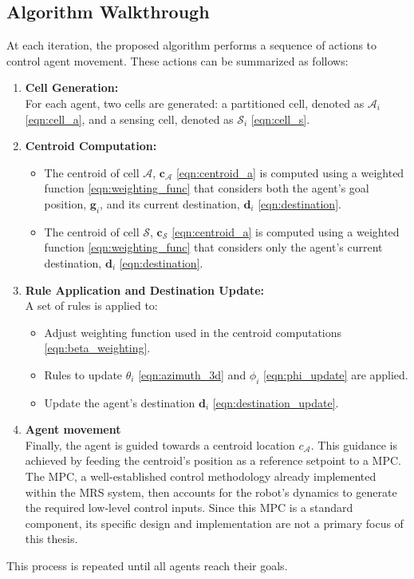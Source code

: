     \subsection{Algorithm Walkthrough}
        At each iteration, the proposed algorithm performs a sequence of actions to control agent movement. 
        These actions can be summarized as follows:
        \begin{enumerate}
            \item \textbf{Cell Generation:} \\
                For each agent, two cells are generated: a partitioned cell, denoted as $\mathcal{A}_i$ \eqref{eqn:cell_a}, and a sensing cell, denoted as $\mathcal{S}_i$ \eqref{eqn:cell_s}.
            \item \textbf{Centroid Computation:}
                \begin{itemize}
                    \item The centroid of cell $\mathcal{A}$, $\mathbf{c}_{\mathcal{A}}$ \eqref{eqn:centroid_a} is computed using a weighted function \eqref{eqn:weighting_func} that considers both the agent's goal position, $\mathbf{g}_i$, and its current destination, $\mathbf{d}_i$ \eqref{eqn:destination}.
                    \item The centroid of cell $\mathcal{S}$, $\mathbf{c}_{\mathcal{S}}$ \eqref{eqn:centroid_a} is computed using a weighted function \eqref{eqn:weighting_func} that considers only the agent's current destination, $\mathbf{d}_i$ \eqref{eqn:destination}.
                \end{itemize}
            \item \textbf{Rule Application and Destination Update:} \\
                A set of rules is applied to: 
                \begin{itemize}
                    \item Adjust weighting function used in the centroid computations \eqref{eqn:beta_weighting}.
                    \item Rules to update $\theta_i$ \eqref{eqn:azimuth_3d} and $\phi_i$ \eqref{eqn:phi_update} are applied.
                    \item Update the agent's destination $\mathbf{d}_i$ \eqref{eqn:destination_update}.
                \end{itemize}
            \item \textbf{Agent movement} \\
                Finally, the agent is guided towards a centroid location $c_{\mathcal{A}}$.
                This guidance is achieved by feeding the centroid's position as a reference setpoint to a \ac{MPC}. 
                The \ac{MPC}, a well-established control methodology already implemented within the \ac{MRS} system, then accounts for the robot's dynamics to generate the required low-level control inputs. 
                Since this \ac{MPC} is a standard component, its specific design and implementation are not a primary focus of this thesis.
        \end{enumerate}
        This process is repeated until all agents reach their goals.


